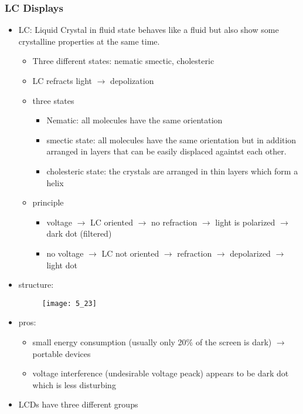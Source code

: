\documentclass{standalone}
\begin{document}
\subsubsection*{LC Displays}
\begin{itemize}
\item LC: Liquid Crystal in fluid state behaves like a fluid but also show some crystalline properties at the same time.
	\begin{itemize}
		\item Three different states: nematic smectic, cholesteric
		\item LC refracts light $\rightarrow$ depolization
		\item three states
			\begin{itemize}
				\item Nematic: all molecules have the same orientation
				\item smectic state: all molecules have the same orientation but in addition arranged in layers that can be easily displaced againtst each other.
				\item cholesteric state: the crystals are arranged in thin layers which form a helix
			\end{itemize}
	\end{itemize}
\begin{itemize}
\item principle
	\begin{itemize}
		\item voltage $\rightarrow$ LC oriented $\rightarrow$ no refraction $\rightarrow$ light is polarized $\rightarrow$ dark dot (filtered)
		\item no voltage $\rightarrow$ LC not oriented $\rightarrow$ refraction $\rightarrow$ depolarized $\rightarrow$ light dot
	\end{itemize}
\end{itemize}
\item structure:
	\begin{figure}
		\texttt{[image: 5\_23]}
	\end{figure}
\item pros:
	\begin{itemize}
		\item small energy consumption (usually only 20\% of the screen is dark) $\rightarrow$ portable devices
		\item voltage interference (undesirable voltage peack) appears to be dark dot which is less disturbing
	\end{itemize}
\item LCDs have three different groups

\end{itemize}
\end{document}
